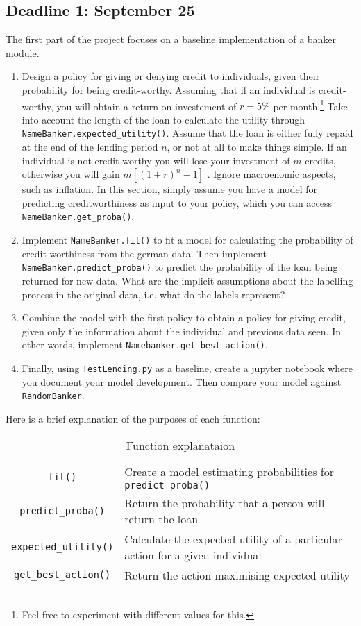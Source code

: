 \subsection{Deadline 1: September 25}
The first part of the project focuses on a baseline implementation of a banker module.
\begin{enumerate}
\item Design a policy for giving or denying credit to individuals, given their probability for being credit-worthy. Assuming that if an individual is credit-worthy, you will obtain a return on investement of $r = 5\%$ per month.\footnote{Feel free to experiment with different values for this.} Take into account the length of the loan to calculate the utility through \verb|NameBanker.expected_utility()|. Assume that the loan is either fully repaid at the end of the lending period $n$, or not at all to make things simple. If an individual is not credit-worthy you will lose your investment of $m$ credits, otherwise you will gain $m [(1 + r)^{n} - 1]$ . Ignore macroenomic aspects, such as inflation. In this section, simply assume you have a model for predicting creditworthiness as input to your policy, which you can access \verb|NameBanker.get_proba()|. 
\item Implement \verb|NameBanker.fit()| to fit a model for calculating the probability of credit-worthiness from the german data. Then implement \verb|NameBanker.predict_proba()| to predict the probability of the loan being returned for new data. What are the implicit assumptions about the labelling process in the original data, i.e. what do the labels represent?
\item Combine the model with the first policy to obtain a policy for giving credit, given only the information about the individual and previous data seen. In other words, implement \verb|Namebanker.get_best_action()|.
\item Finally, using \verb|TestLending.py| as a baseline, create a jupyter notebook where you document your model development. Then compare your model against \verb|RandomBanker|.
\end{enumerate}
Here is a brief explanation of the purposes of each function:
\begin{table}[H]
  \centering
  \begin{tabular}{c|l}
    \verb|fit()| & Create a model estimating probabilities for \verb|predict_proba()|\\
  \verb|predict_proba()| & Return the probability that a person will return the loan\\
  \verb|expected_utility()| & Calculate the expected utility of a particular action for a given individual\\
  \verb|get_best_action()| & Return the action maximising expected utility
\end{tabular}

\caption{Function explanataion}
\label{tab:functions}
\end{table}
